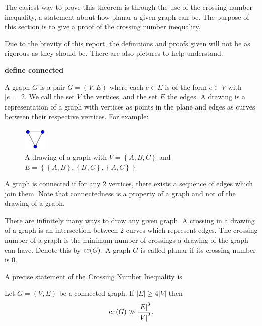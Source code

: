 \documentclass[12pt]{amsart}
\begin{document}
The easiest way to prove this theorem is through the use of the crossing number inequality,
a statement about how planar a given graph can be. The purpose of this section is to give a proof
of the crossing number inequality.

Due to the brevity of this report, the definitions and proofs given will not be
as rigorous as they should be. There are also pictures to help understand.



\textbf{define connected}

A graph \(G\) is a pair \(G = (V,E)\) where each \(e \in E\) is of the form \(e \subset V\) with \(\left\lvert e \right\rvert = 2\).
We call the set \(V\) the vertices, and the set \(E\) the edges. A drawing is
a representation of a graph with vertices as points in the plane and edges as curves between their
respective vertices. For example:

\begin{figure}[h]
    \centering
    \includegraphics[width=0.1\textwidth]{3graph.png}
    \caption{A drawing of a graph with \(V = \left\{ A,B,C \right\}\) and \(E = \left\{ \left\{ A,B \right\} , \left\{ B,C \right\} ,\left\{ A,C \right\}  \right\} \)}
\end{figure}

A graph is connected if for any 2 vertices, there exists a sequence of edges which join them.
Note that connectedness is a property of a graph and not of the drawing of a graph.

There are infinitely many ways to draw any given graph. A crossing in a drawing
of a graph is an intersection between 2 curves which represent edges. The 
crossing number of a graph is the minimum number of crossings a drawing
of the graph can have. Denote this by
\(\operatorname{cr}(G)\). A graph \(G\) is called planar if its crossing number is 0.

A precise statement of the Crossing Number Inequality is

\begin{theorem}\label{thm:crossing-number-inequality}
    Let \(G = (V,E)\) be a connected graph. If \(\left\lvert E \right\rvert \geq 4 \left\lvert V \right\rvert \)
    then
    \[
        \operatorname{cr}\left( G \right) \gg \frac{\left\lvert E \right\rvert ^{3} }{\left\lvert V \right\rvert ^{2}}  
    .\]
\end{theorem}
\end{document}
